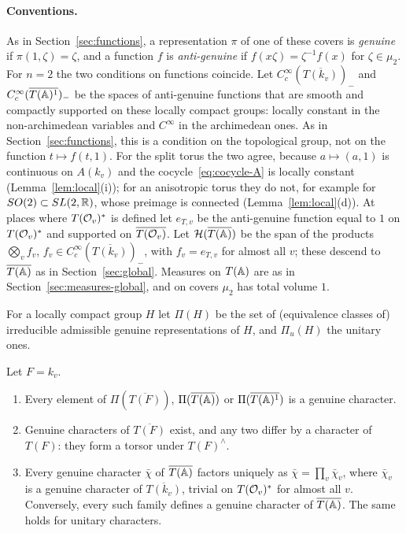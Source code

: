 \paragraph{Conventions.}
As in Section~\ref{sec:functions}, a representation $\pi$ of one of these
covers is \emph{genuine} if $\pi(1,\zeta)=\zeta$, and a function $f$ is
\emph{anti-genuine} if $f(x\zeta)=\zeta^{-1}f(x)$ for $\zeta\in\mu_2$.
For $n=2$ the two conditions on functions coincide. Let
$C_c^\infty(\overline{T(k_v)})_-$ and $C_c^\infty(\overline{T(\mathbb{A})^1})_-$
be the spaces of anti-genuine functions that are smooth and compactly
supported on these locally compact groups: locally constant in the
non-archimedean variables and $C^\infty$ in the archimedean ones. As in
Section~\ref{sec:functions}, this is a condition on the topological
group, not on the function $t\mapsto f(t,1)$. For the split torus the two
agree, because $a\mapsto(a,1)$ is continuous on $A(k_v)$ and the
cocycle~\eqref{eq:cocycle-A} is locally constant
(Lemma~\ref{lem:local}(i)); for an anisotropic torus they do not, for
example for $SO(2)\subset SL(2,\mathbb{R})$, whose preimage is connected
(Lemma~\ref{lem:local}(d)). At places where $T(\mathcal{O}_v)^*$ is defined
let $e_{T,v}$ be the anti-genuine function equal to $1$ on
$T(\mathcal{O}_v)^*$ and supported on $\overline{T(\mathcal{O}_v)}$. Let
$\mathcal H(\overline{T(\mathbb{A})})$ be the span of the products
$\bigotimes_vf_v$, $f_v\in C_c^\infty(\overline{T(k_v)})_-$, with
$f_v=e_{T,v}$ for almost all $v$; these descend to $\overline{T(\mathbb{A})}$ as
in Section~\ref{sec:global}. Measures on $T(\mathbb{A})$ are as in
Section~\ref{sec:measures-global}, and on covers $\mu_2$ has total volume $1$.

For a locally compact group $H$ let $\Pi(H)$ be the set of
(equivalence classes of) irreducible admissible genuine representations
of $H$, and $\Pi_u(H)$ the unitary ones.

\begin{lemma}\label{lem:genuine-chars}
Let $F=k_v$.
\begin{enumerate}[label=(\alph*)]
\item Every element of $\Pi(\overline{T(F)})$, $\Pi(\overline{T(\mathbb{A})})$ or
  $\Pi(\overline{T(\mathbb{A})^1})$ is a genuine character.
\item Genuine characters of $\overline{T(F)}$ exist, and any two differ
  by a character of $T(F)$: they form a torsor under $T(F)^\wedge$.
\item Every genuine character $\bar\chi$ of $\overline{T(\mathbb{A})}$ factors
  uniquely as $\bar\chi=\prod_v\bar\chi_v$, where $\bar\chi_v$ is a
  genuine character of $\overline{T(k_v)}$, trivial on $T(\mathcal{O}_v)^*$ for
  almost all $v$. Conversely, every such family defines a genuine
  character of $\overline{T(\mathbb{A})}$. The same holds for unitary characters.
\end{enumerate}
\end{lemma}

